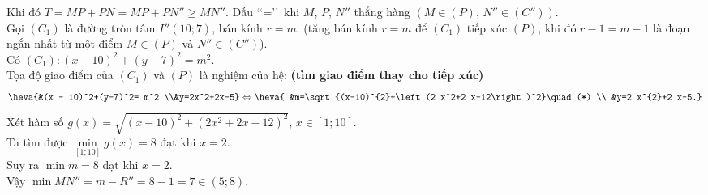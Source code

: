 \begin{ex}
{\begin{center}
\end{center}
Khi đó $T=MP+PN=M P+PN''\geq M N''$. Dấu \lq\lq =\rq\rq\, khi $M$, $P$, $N''$ thẳng hàng $\left(M \in(P),\,N'' \in\left(C''\right)\right)$.\\
Gọi $\left(C_1\right)$ là đường tròn tâm $I''(10 ; 7)$, bán kính $r=m$. (tăng bán kính $r=m$ để $\left(C_1\right)$ tiếp xúc $(P)$, khi đó $r-1=m-1$ là đoạn ngắn nhất từ một điểm $M \in(P)$ và $N'' \in\left(C''\right)$).\\
Có $\left(C_1\right)\colon (x-10)^{2}+(y-7)^2=m^{2}$.\\
Tọa độ giao điểm của $\left(C_1\right)$ và $(P)$ là nghiệm của hệ: {\bf (tìm giao điểm thay cho tiếp xúc)}
\[\heva{&(x - 10)^2+(y-7)^2= m^2 \\&y=2x^2+2x-5}
\Leftrightarrow \heva{
&m=\sqrt{(x-10)^{2}+\left(2 x^2+2 x-12\right)^2}\quad(*) \\
&y=2 x^{2}+2 x-5.}\]
Xét hàm số $ g(x)=\sqrt{(x-10)^{2}+\left(2 x^2+2 x-12\right)^2} $, $x \in[1;10]$.\\
Ta tìm được $ \min \limits_{[1;10]} g(x)=8$ đạt khi $x=2$.\\
Suy ra $ \min m=8$ đạt khi $x=2$.\\
Vậy $\min MN''=m-R''=8-1=7 \in(5;8)$.
}
\end{ex}

